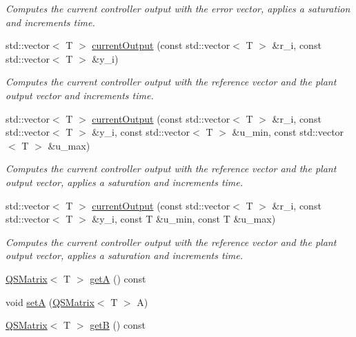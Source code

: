 \begin{DoxyCompactItemize}
\begin{DoxyCompactList}\small\item\em Computes the current controller output with the error vector, applies a saturation and increments time. \end{DoxyCompactList}\item 
std\+::vector$<$ T $>$ \hyperlink{classStateSpaceController_a9cc4af00ba51e6043ccc5666ada85353}{current\+Output} (const std\+::vector$<$ T $>$ \&r\+\_\+i, const std\+::vector$<$ T $>$ \&y\+\_\+i)
\begin{DoxyCompactList}\small\item\em Computes the current controller output with the reference vector and the plant output vector and increments time. \end{DoxyCompactList}\item 
std\+::vector$<$ T $>$ \hyperlink{classStateSpaceController_a52ad5f8c8e95ee2a4235e521aec815d2}{current\+Output} (const std\+::vector$<$ T $>$ \&r\+\_\+i, const std\+::vector$<$ T $>$ \&y\+\_\+i, const std\+::vector$<$ T $>$ \&u\+\_\+min, const std\+::vector$<$ T $>$ \&u\+\_\+max)
\begin{DoxyCompactList}\small\item\em Computes the current controller output with the reference vector and the plant output vector, applies a saturation and increments time. \end{DoxyCompactList}\item 
std\+::vector$<$ T $>$ \hyperlink{classStateSpaceController_a3aefff5d3b55ef64241e3779323fa18e}{current\+Output} (const std\+::vector$<$ T $>$ \&r\+\_\+i, const std\+::vector$<$ T $>$ \&y\+\_\+i, const T \&u\+\_\+min, const T \&u\+\_\+max)
\begin{DoxyCompactList}\small\item\em Computes the current controller output with the reference vector and the plant output vector, applies a saturation and increments time. \end{DoxyCompactList}\item 
\hyperlink{classQSMatrix}{Q\+S\+Matrix}$<$ T $>$ \hyperlink{classStateSpaceController_a8d77d03a26c8bfa9bbde672431f7d5ec}{getA} () const
\item 
void \hyperlink{classStateSpaceController_a189d9fcd45640e9cfcede5b7448a20d4}{setA} (\hyperlink{classQSMatrix}{Q\+S\+Matrix}$<$ T $>$ A)
\item 
\hyperlink{classQSMatrix}{Q\+S\+Matrix}$<$ T $>$ \hyperlink{classStateSpaceController_a6435a06adbe5654d2fff6923da41db0c}{getB} () const

\end{DoxyCompactItemize}
